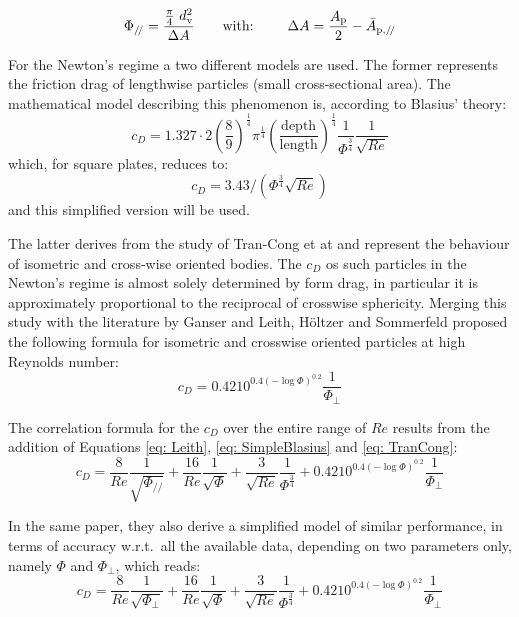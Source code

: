 		\begin{equation}
			\Phi_{/\!/} = \dfrac{\frac{\pi}{4}\ \dv^2} {\Delta A} \qquad \text{with: } \qquad \Delta A = \dfrac{A_{\textup{p}}}{2} - \bar{A}_{\textup{p},/\!/}
			\label{eq: Lengthwise}
		\end{equation}

		For the Newton's regime a two different models are used. The former
		represents the friction drag of lengthwise particles (small cross-sectional area). The mathematical model describing this phenomenon is, according to Blasius' theory:
		\begin{equation}
			c_D = 1.327 \cdot 2 \left(\frac{8}{9}\right)^{\frac{1}{4}} \pi^{\frac{1}{4}} \left(\frac{\text{depth}}{\text{length}}\right)^{\frac{1}{4}} \frac{1}{\Phi^{\frac{3}{4}}} \frac{1}{\sqrt{Re}}
			\label{eq: Blasius}
		\end{equation}
		which, for square plates, reduces to:
		\begin{equation}
			c_D = 3.43 / (\Phi^{\frac{3}{4}} \sqrt{Re})
			\label{eq: SimpleBlasius}
		\end{equation}
		and this simplified version will be used.
		
		The latter derives from the study of Tran-Cong et at \cite{TranCongEtAl-2004} and represent the behaviour of isometric and cross-wise oriented bodies. The $ c_D $ os such particles in the Newton's regime is almost solely determined by form drag, in particular it is approximately proportional to the reciprocal of crosswise sphericity. Merging this study with the literature by Ganser and Leith, H\"{o}ltzer and Sommerfeld proposed the following formula for isometric and crosswise oriented particles at high Reynolds number:
		\begin{equation}
			c_D = 0.4210^{0.4(-\log \Phi)^{0.2}} \frac{1}{\Phi_{\perp}}
			\label{eq: TranCong}
		\end{equation}

		The correlation formula for the $ c_D $ over the entire range of $ Re  $ results from the addition of Equations \ref{eq: Leith}, \ref{eq: SimpleBlasius} and \ref{eq: TranCong}:
		\begin{equation}
			c_D = \frac{8}{Re} \frac{1}{\sqrt{\Phi_{/\!/}}} 
			    + \frac{16}{Re} \frac{1}{\sqrt{\Phi}} 
			    + \frac{3}{\sqrt{Re}} \frac{1}{\Phi^{\frac{3}{4}}} 
			    + 0.4210^{0.4(-\log \Phi)^{0.2}} \frac{1}{\Phi_{\perp}}
			\label{eq: HS}
		\end{equation}
	
		In the same paper, they also derive a simplified model of similar performance, in terms of accuracy w.r.t.\ all the available data, depending on two parameters only, namely $\Phi$ and $\Phi_{\perp}$, which reads:
		\begin{equation}
			c_D = \frac{8}{Re} \frac{1}{\sqrt{\Phi_{\perp}}} 
			    + \frac{16}{Re} \frac{1}{\sqrt{\Phi}} 
			    + \frac{3}{\sqrt{Re}} \frac{1}{\Phi^{\frac{3}{4}}} 
			    + 0.4210^{0.4(-\log \Phi)^{0.2}} \frac{1}{\Phi_{\perp}}
			\label{eq: SimpleHS}
		\end{equation}
		
